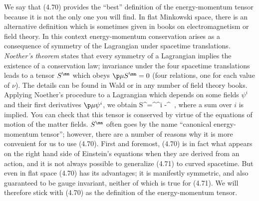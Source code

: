 We say that (4.70) provides the ``best'' definition of the energy-momentum
tensor because it is not the only one you will find.  In flat Minkowski 
space, there is an alternative definition which is sometimes given in books
on electromagnetism or field theory.  In this context energy-momentum
conservation arises as a consequence of symmetry of the Lagrangian
under spacetime translations.  {\it Noether's theorem}
states that every symmetry of a Lagrangian implies the existence
of a conservation law; invariance under the four spacetime translations 
leads to a tensor $S^\mn$ which obeys $\p\mu S^\mn=0$ (four relations,
one for each value of $\nu$).  The details can be found in Wald or
in any number of field theory books.  Applying Noether's procedure
to a Lagrangian which depends on some fields $\psi^i$ and their
first derivatives $\p\mu\psi^i$, we obtain
\be
  S^\mn={{}}\partial^\nu\psi^i
  -\eta^\ ,\label{4.71}
\ee
where a sum over $i$ is implied.  You can check that this tensor
is conserved by virtue of the equations of motion of the matter
fields.  $S^\mn$ often goes by the name ``canonical
energy-momentum tensor''; however, there are a number of reasons
why it is more convenient for us to use (4.70).  First and foremost,
(4.70) is in fact what appears on the right hand side of 
Einstein's equations when they are derived from an action, and it
is not always possible to generalize (4.71) to curved spacetime.  
But even in flat space (4.70) has its advantages; it is
manifestly symmetric, and also guaranteed to be gauge invariant,
neither of which is true for (4.71).  We will therefore stick with
(4.70) as the definition of the energy-momentum tensor.

